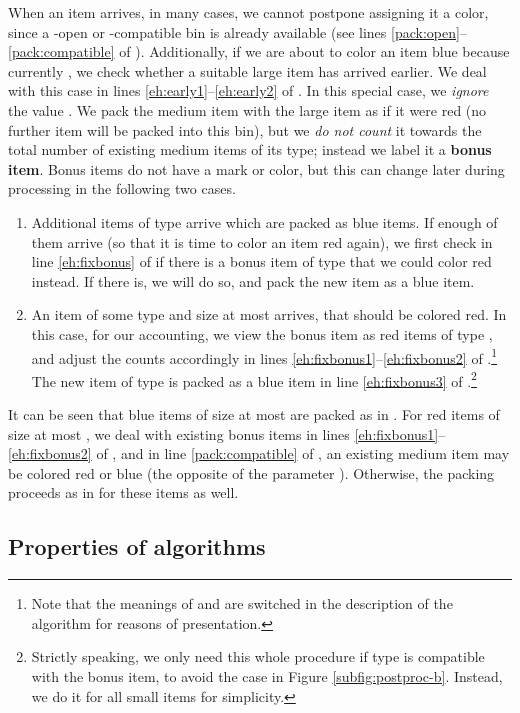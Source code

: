 When an item arrives, in many cases, we cannot postpone assigning it a color, since a -open or -compatible bin is already available (see
lines \ref{pack:open}--\ref{pack:compatible} of ).
Additionally, if we are about to color an item blue because currently , we check whether a suitable large item has
arrived earlier. We deal with this case in lines \ref{eh:early1}--\ref{eh:early2}
of {\EHarm}.
In this special case, we \emph{ignore} the value .
We pack the medium item with the large item as if it were red (no further item will be packed into this bin), but we \emph{do not count} it towards the total number of existing medium items of its type; instead we label it a \textbf{bonus item}. Bonus items do not have a mark or color,
but this can change later during processing in the following two cases.


\begin{enumerate}
\item
Additional items of type  arrive which are packed as blue items. If enough of them arrive (so that it is time to color an item red again), we first check in line \ref{eh:fixbonus} of {\EHarm} if there is a bonus item of type  that we could color red instead. If there is, we will do so, and pack the new item as a blue item.
\item
An item of some type  and size at most  arrives, that should be colored red.
In this case, for our accounting, we view the bonus item as  red items of type , and adjust the counts accordingly in lines \ref{eh:fixbonus1}--\ref{eh:fixbonus2}
of \EHarm.\footnote{Note that the meanings of 
and  are switched in the description of the algorithm for reasons of presentation.}
The new item of type  is packed as a blue item in line \ref{eh:fixbonus3} of 
\EHarm.\footnote{Strictly speaking, we only need this whole procedure if type  is compatible with the bonus item, to avoid the case in Figure \ref{subfig:postproc-b}.
Instead, we do it for all small items for simplicity.}
\end{enumerate} 



It can be seen that blue items of size at most  are packed as in {\SuperH}.
For red items of size at most , we deal with existing bonus items in lines \ref{eh:fixbonus1}--\ref{eh:fixbonus2} of \EHarm, and in line \ref{pack:compatible} of , an existing medium item may be colored red or blue (the opposite of the parameter ).
Otherwise, the packing proceeds as in {\SuperH} for these items as well.


\subsection{Properties of {\EHarm} algorithms}

